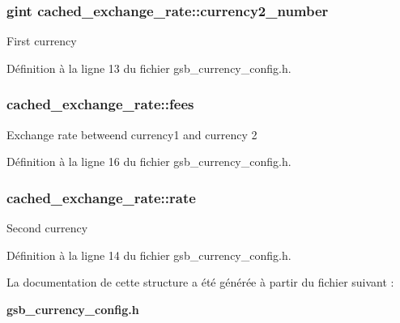 \subsubsection[{currency2\_\-number}]{\setlength{\rightskip}{0pt plus 5cm}gint {\bf cached\_\-exchange\_\-rate::currency2\_\-number}}\label{structcached__exchange__rate_ae1641a8d778012a4cf6a3f7d5ca3d263}
First currency 

Définition à la ligne 13 du fichier gsb\_\-currency\_\-config.h.

\subsubsection[{fees}]{ {\bf cached\_\-exchange\_\-rate::fees}}\label{structcached__exchange__rate_a5e571a055d7b753133dfaaa8ae254d24}
Exchange rate betweend currency1 and currency 2 

Définition à la ligne 16 du fichier gsb\_\-currency\_\-config.h.

\subsubsection[{rate}]{ {\bf cached\_\-exchange\_\-rate::rate}}\label{structcached__exchange__rate_a10297f7d5019645ee713374b8a9d46ff}
Second currency 

Définition à la ligne 14 du fichier gsb\_\-currency\_\-config.h.



La documentation de cette structure a été générée à partir du fichier suivant :\begin{DoxyCompactItemize}
\item 
{\bf gsb\_\-currency\_\-config.h}\end{DoxyCompactItemize}
